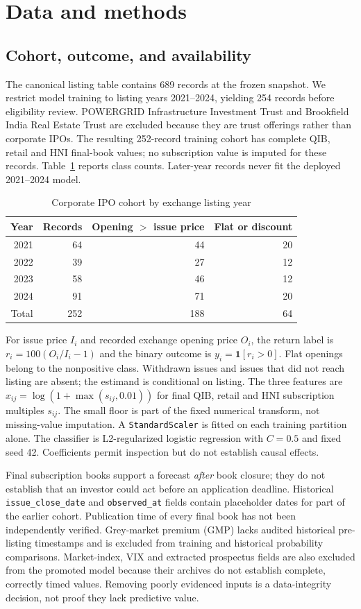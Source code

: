 \documentclass[runningheads]{llncs}
\begin{document}
\section{Data and methods}
\subsection{Cohort, outcome, and availability}
The canonical listing table contains 689 records at the frozen snapshot. We restrict model training to listing years 2021--2024, yielding 254 records before eligibility review. POWERGRID Infrastructure Investment Trust and Brookfield India Real Estate Trust are excluded because they are trust offerings rather than corporate IPOs. The resulting 252-record training cohort has complete QIB, retail and HNI final-book values; no subscription value is imputed for these records. Table~\ref{tab:cohort} reports class counts. Later-year records never fit the deployed 2021--2024 model.
\begin{table}[tb]
\caption{Corporate IPO cohort by exchange listing year}\label{tab:cohort}
\centering
\begin{tabular}{@{}rrrr@{}}\toprule
Year & Records & Opening $>$ issue price & Flat or discount\\\midrule
2021 & 64 & 44 & 20\\
2022 & 39 & 27 & 12\\
2023 & 58 & 46 & 12\\
2024 & 91 & 71 & 20\\\midrule
Total & 252 & 188 & 64\\\bottomrule
\end{tabular}
\end{table}
For issue price $I_i$ and recorded exchange opening price $O_i$, the return label is $r_i=100(O_i/I_i-1)$ and the binary outcome is $y_i=\mathbf{1}[r_i>0]$. Flat openings belong to the nonpositive class. Withdrawn issues and issues that did not reach listing are absent; the estimand is conditional on listing. The three features are $x_{ij}=\log(1+\max(s_{ij},0.01))$ for final QIB, retail and HNI subscription multiples $s_{ij}$. The small floor is part of the fixed numerical transform, not missing-value imputation. A \texttt{StandardScaler} is fitted on each training partition alone. The classifier is L2-regularized logistic regression with $C=0.5$ and fixed seed 42. Coefficients permit inspection but do not establish causal effects.

Final subscription books support a forecast \emph{after} book closure; they do not establish that an investor could act before an application deadline. Historical \texttt{issue\_close\_date} and \texttt{observed\_at} fields contain placeholder dates for part of the earlier cohort. Publication time of every final book has not been independently verified. Grey-market premium (GMP) lacks audited historical pre-listing timestamps and is excluded from training and historical probability comparisons. Market-index, VIX and extracted prospectus fields are also excluded from the promoted model because their archives do not establish complete, correctly timed values. Removing poorly evidenced inputs is a data-integrity decision, not proof they lack predictive value.
\end{document}
